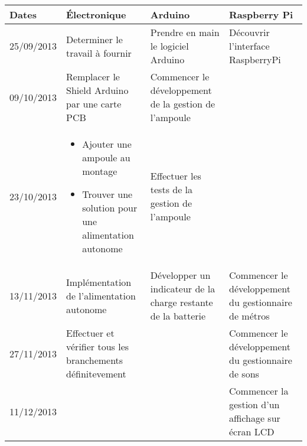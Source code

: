 \begin{center}
	\begin{tabular}{| l | m{3.5cm} | m{3.5cm} | m{3.5cm} |}
		
		\hline
		\textbf{Dates} & \textbf{Électronique} & \textbf{Arduino} & \textbf{Raspberry Pi} \\ \hline
		25/09/2013 & Determiner le travail à fournir & Prendre en main le logiciel Arduino & Découvrir l'interface RaspberryPi \\ \hline
		
		09/10/2013 & Remplacer le Shield Arduino par une carte PCB & Commencer le développement de la gestion de l'ampoule & \\ \hline
		
		23/10/2013 & 
					\begin{itemize}
					\item Ajouter une ampoule au montage
					\item Trouver une solution pour une alimentation autonome
					\end{itemize}	& Effectuer les tests de la gestion de l'ampoule & \\ \hline
		
		13/11/2013 & Implémentation de l'alimentation autonome & Développer un indicateur de la charge restante de la batterie & Commencer le développement du gestionnaire de métros \\ \hline
		
		27/11/2013 & Effectuer et vérifier tous les branchements définitevement & & Commencer le développement du gestionnaire de sons\\ \hline
		
		11/12/2013 & & & Commencer la gestion d'un affichage sur écran LCD \\ \hline
		
	\end{tabular}
\end{center}